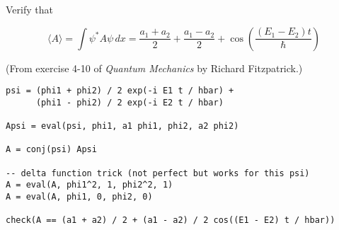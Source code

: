 \documentclass[12pt]{article}
\begin{document}
\begin{enumerate}
Verify that

\begin{equation*}
\langle A\rangle
=\int\psi^*A\psi\,dx
=\frac{a_1+a_2}{2}+\frac{a_1-a_2}{2}+\cos\left(\frac{(E_1-E_2)t}{\hbar}\right)
\end{equation*}

(From exercise 4-10 of {\it Quantum Mechanics} by Richard Fitzpatrick.)

\begin{verbatim}
psi = (phi1 + phi2) / 2 exp(-i E1 t / hbar) +
      (phi1 - phi2) / 2 exp(-i E2 t / hbar)

Apsi = eval(psi, phi1, a1 phi1, phi2, a2 phi2)

A = conj(psi) Apsi

-- delta function trick (not perfect but works for this psi)
A = eval(A, phi1^2, 1, phi2^2, 1)
A = eval(A, phi1, 0, phi2, 0)

check(A == (a1 + a2) / 2 + (a1 - a2) / 2 cos((E1 - E2) t / hbar))
\end{verbatim}

\end{enumerate}
\end{document}

